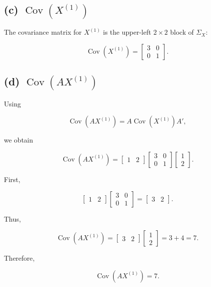 \documentclass[12pt]{article}
\begin{document}
\subsection*{(c) $\operatorname{Cov}(X^{(1)})$}

The covariance matrix for $X^{(1)}$ is the upper-left $2\times2$ block of $\Sigma_X$:

\[
\boxed{
\operatorname{Cov}(X^{(1)})
=
\begin{bmatrix}
3&0\\
0&1
\end{bmatrix}
}.
\]

\subsection*{(d) $\operatorname{Cov}(AX^{(1)})$}

Using

\[
\operatorname{Cov}(AX^{(1)})
=
A\operatorname{Cov}(X^{(1)})A',
\]

we obtain

\[
\operatorname{Cov}(AX^{(1)})
=
\begin{bmatrix}
1&2
\end{bmatrix}
\begin{bmatrix}
3&0\\
0&1
\end{bmatrix}
\begin{bmatrix}
1\\
2
\end{bmatrix}.
\]

First,

\[
\begin{bmatrix}
1&2
\end{bmatrix}
\begin{bmatrix}
3&0\\
0&1
\end{bmatrix}
=
\begin{bmatrix}
3&2
\end{bmatrix}.
\]

Thus,

\[
\operatorname{Cov}(AX^{(1)})
=
\begin{bmatrix}
3&2
\end{bmatrix}
\begin{bmatrix}
1\\
2
\end{bmatrix}
=
3+4=7.
\]

Therefore,

\[
\boxed{
\operatorname{Cov}(AX^{(1)})=7
}.
\]
\end{document}
